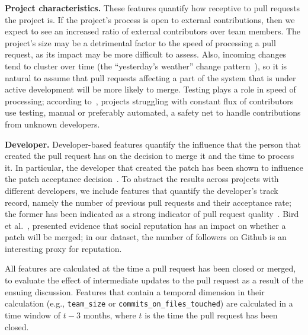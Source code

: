 \documentclass{acm_proc_article-sp}
\begin{document}
  \textbf{Project characteristics.} These features quantify how receptive to pull
  requests the project is.  If the project's process is open to external
  contributions, then we expect to see an increased ratio of external
  contributors over team members. The project's size may be a detrimental factor
  to the speed of processing a pull request, as its impact may be more difficult
  to assess. Also, incoming changes tend to cluster over time (the
  ``yesterday's weather'' change pattern~\cite{Girba04}), so it is natural to
  assume that pull requests affecting a part of the system that is under active
  development will be more likely to merge.  Testing plays a role in speed of
  processing; according to~\cite{Pham13}, projects struggling with constant flux
  of contributors use testing, manual or preferably automated, a safety net to
  handle contributions from unknown developers.

  \textbf{Developer.}  
    Developer-based features quantify the influence that the person that
    created the pull request has on the decision to merge it and
    the time to process it. In particular, the developer that created the patch
    has been shown to influence the patch acceptance decision~\cite{Jeong09}. To
    abstract the results across projects with different developers, we
    include features that quantify the developer's track record, namely the
    number of previous pull requests and their acceptance rate; the former has
    been indicated as a strong indicator of pull request quality~\cite{Pham13}.
    Bird et al.~\cite{Bird07}, presented evidence that social
    reputation has an impact on whether a patch will be merged; in our dataset,
    the number of followers on Github is an interesting proxy for
    reputation.

All features are calculated at the time a pull request has been closed or
merged, to evaluate the effect of intermediate updates to the pull request as a
result of the ensuing discussion. Features that contain a temporal dimension in
their calculation (e.g., \texttt{team\_size} or
\texttt{commits\_on\_files\_touched}) are calculated in a time window of $t - 3$
months, where $t$ is the time the pull request has been closed. 
\end{document}
